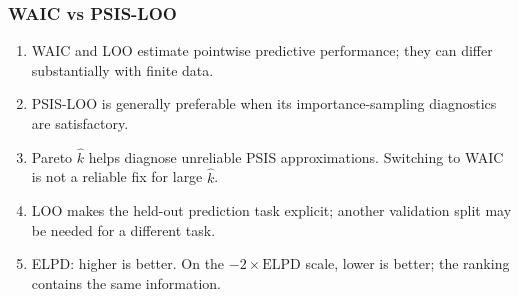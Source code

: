 \documentclass[10pt]{beamer}
\begin{document}
\begin{frame}{}

\frametitle{WAIC vs PSIS-LOO}

\begin{enumerate}
  \item<2-> WAIC and LOO estimate pointwise predictive performance;
    they can differ substantially with finite data.
  \item<3-> PSIS-LOO is generally preferable when its importance-sampling
    diagnostics are satisfactory.
  \item<4-> Pareto $\widehat k$ helps diagnose unreliable PSIS approximations.
    Switching to WAIC is not a reliable fix for large $\widehat k$.
  \item<5-> LOO makes the held-out prediction task explicit;
    another validation split may be needed for a different task.
  \item<6-> ELPD: higher is better. On the $-2\times\text{ELPD}$ scale,
    lower is better; the ranking contains the same information.
\end{enumerate}

\end{frame}
\end{document}
